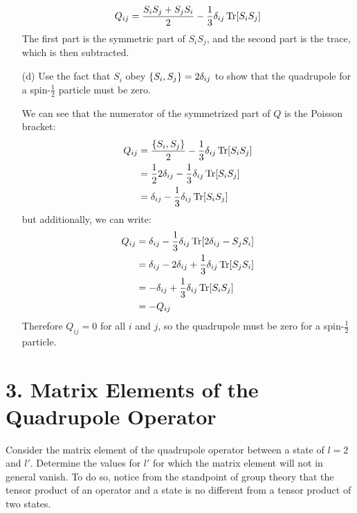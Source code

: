 \documentclass[a4paper,twoside]{article}
\begin{document}
\begin{itemize}
\begin{problem}
            \begin{equation}
                Q_{ij} = \frac{S_i S_j + S_j S_i}{2} - \frac{1}{3} \delta_{ij} \Tr[S_i S_j]
            \end{equation}
            The first part is the symmetric part of $ S_i S_j $, and the second part is the trace, which is then subtracted.
        \end{problem}
    \item[(d)] Use the fact that $ S_i $ obey $ \pb{S_i}{S_j} = 2 \delta_{ij} $ to show that the quadrupole for a spin-$ \frac{1}{2} $ particle must be zero.
        \begin{problem}
            We can see that the numerator of the symmetrized part of $ Q $ is the Poisson bracket:
            \begin{align}
                Q_{ij} &= \frac{\pb{S_i}{S_j}}{2} - \frac{1}{3} \delta_{ij} \Tr[S_i S_j] \\
                &= \frac{1}{2} 2 \delta_{ij} - \frac{1}{3} \delta_{ij} \Tr[S_i S_j] \\
                &= \delta_{ij} - \frac{1}{3} \delta_{ij} \Tr[S_i S_j] \\ 
            \end{align}
            but additionally, we can write:
            \begin{align}
                Q_{ij} &= \delta_{ij} - \frac{1}{3} \delta_{ij} \Tr[2 \delta_{ij} - S_j S_i] \\
                &= \delta_{ij} - 2 \delta_{ij} + \frac{1}{3} \delta_{ij} \Tr[S_j S_i] \\
                &= - \delta_{ij} + \frac{1}{3} \delta_{ij} \Tr[S_i S_j] \\
                &= -Q_{ij}
            \end{align}
            Therefore $ Q_{ij} = 0 $ for all $ i $ and $ j $, so the quadrupole must be zero for a spin-$ \frac{1}{2} $ particle.
        \end{problem}
\end{itemize}

\section*{3. Matrix Elements of the Quadrupole Operator}
Consider the matrix element of the quadrupole operator between a state of $ l=2 $ and $ l' $. Determine the values for $ l' $ for which the matrix element will not in general vanish. To do so, notice from the standpoint of group theory that the tensor product of an operator and a state is no different from a tensor product of two states.
\end{document}
